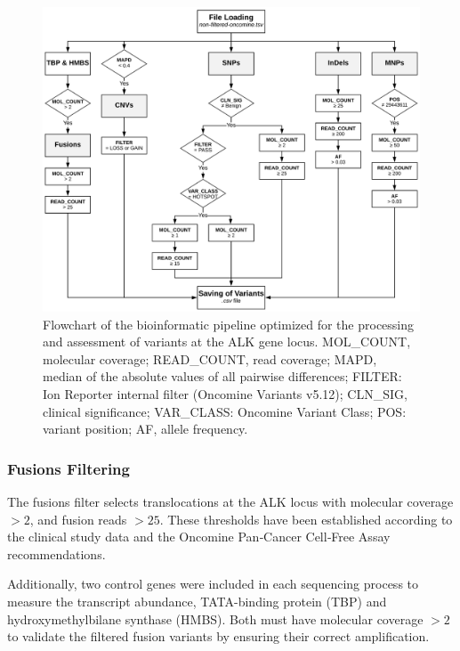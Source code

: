 \begin{figure}[ht]
    \centering
    \includegraphics[width=\textwidth]{Images/chapter_4/mut_filtering.png}
    \caption{Flowchart of the bioinformatic pipeline optimized for the processing and assessment of variants at the ALK gene locus. MOL\_COUNT, molecular coverage; READ\_COUNT, read coverage; MAPD, median of the absolute values of all pairwise differences; FILTER: Ion Reporter\texttrademark{} internal filter (Oncomine\texttrademark{} Variants v5.12); CLN\_SIG, clinical significance; VAR\_CLASS: Oncomine\texttrademark{} Variant Class; POS: variant position; AF, allele frequency.}
    \label{fig:Algorithm}
\end{figure}

\subsubsection{Fusions Filtering}

The fusions filter selects translocations at the ALK locus with molecular coverage $> 2$, and fusion reads $> 25$. These thresholds have been established according to the clinical study data and the Oncomine\texttrademark{} Pan‐Cancer Cell‐Free Assay recommendations.

Additionally, two control genes were included in each sequencing process to measure the transcript abundance, TATA-binding protein (TBP) and hydroxymethylbilane synthase (HMBS). Both must have molecular coverage $> 2$ to validate the filtered fusion variants by ensuring their correct amplification.

